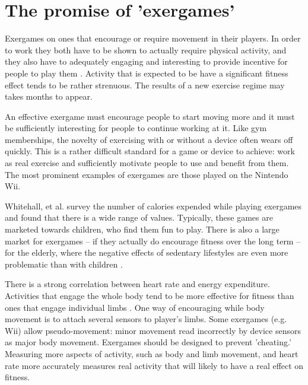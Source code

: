 \documentclass{SIGCHI2015LaTex/sigchi}
\begin{document}
\section{The promise of 'exergames'}
Exergames on ones that encourage or require movement in their players. In order to work they both have to be shown to actually require physical activity, and they also have to adequately engaging and interesting to provide incentive for people to play them \cite{whitehead2010exergame}. Activity that is expected to be have a significant fitness effect tends to be rather strenuous. The results of a new exercise regime may takes months to appear. 

An effective exergame must encourage people to start moving more and it must be sufficiently interesting for people to continue working at it. Like gym memberships, the novelty of exercising with or without a device often wears off quickly. This is a rather difficult standard for a game or device to achieve: work as real exercise and sufficiently motivate people to use and benefit from them. The most prominent examples of exergames are those played on the Nintendo Wii. 

Whitehall, et al. survey the number of calories expended while playing exergames and found that there is a wide range of values. Typically, these games are marketed towards children, who find them fun to play. There is also a large market for exergames -- if they actually do encourage fitness over the long term -- for the elderly, where the negative effects of sedentary lifestyles are even more problematic than with children \cite{vonstad2014exergaming}.

There is a strong correlation between heart rate and energy expenditure\cite{whitehead2010exergame}. Activities that engage the whole body tend to be more effective for fitness than ones that engage individual limbs \cite{mortazavi2014near}. One way of encouraging while body movement is to attach several sensors to player's limbs. Some exergames (e.g. Wii) allow pseudo-movement: minor movement read incorrectly by device sensors as major body movement. Exergames should be designed to prevent 'cheating.' Measuring more aspects of activity, such as body and limb movement, and heart rate more accurately measures real activity that will likely to have a real effect on fitness.  
\end{document}
